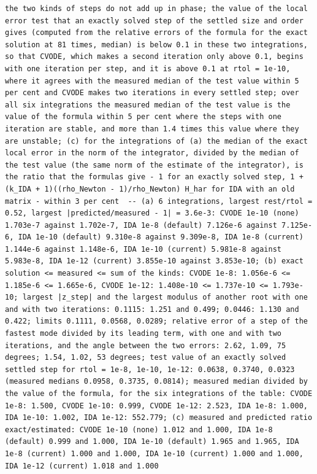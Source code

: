 \documentclass[
  10pt,
]{article}
\begin{document}
\begin{verbatim}
the two kinds of steps do not add up in phase; the value of the local error test that an exactly solved step of the settled size and order gives (computed from the relative errors of the formula for the exact solution at 81 times, median) is below 0.1 in these two integrations, so that CVODE, which makes a second iteration only above 0.1, begins with one iteration per step, and it is above 0.1 at rtol = 1e-10, where it agrees with the measured median of the test value within 5 per cent and CVODE makes two iterations in every settled step; over all six integrations the measured median of the test value is the value of the formula within 5 per cent where the steps with one iteration are stable, and more than 1.4 times this value where they are unstable; (c) for the integrations of (a) the median of the exact local error in the norm of the integrator, divided by the median of the test value (the same norm of the estimate of the integrator), is the ratio that the formulas give - 1 for an exactly solved step, 1 + (k_IDA + 1)((rho_Newton - 1)/rho_Newton) H_har for IDA with an old matrix - within 3 per cent  -- (a) 6 integrations, largest rest/rtol = 0.52, largest |predicted/measured - 1| = 3.6e-3: CVODE 1e-10 (none) 1.703e-7 against 1.702e-7, IDA 1e-8 (default) 7.126e-6 against 7.125e-6, IDA 1e-10 (default) 9.310e-8 against 9.309e-8, IDA 1e-8 (current) 1.144e-6 against 1.148e-6, IDA 1e-10 (current) 5.981e-8 against 5.983e-8, IDA 1e-12 (current) 3.855e-10 against 3.853e-10; (b) exact solution <= measured <= sum of the kinds: CVODE 1e-8: 1.056e-6 <= 1.185e-6 <= 1.665e-6, CVODE 1e-12: 1.408e-10 <= 1.737e-10 <= 1.793e-10; largest |z_step| and the largest modulus of another root with one and with two iterations: 0.1115: 1.251 and 0.499; 0.0446: 1.130 and 0.422; limits 0.1111, 0.0568, 0.0289; relative error of a step of the fastest mode divided by its leading term, with one and with two iterations, and the angle between the two errors: 2.62, 1.09, 75 degrees; 1.54, 1.02, 53 degrees; test value of an exactly solved settled step for rtol = 1e-8, 1e-10, 1e-12: 0.0638, 0.3740, 0.0323 (measured medians 0.0958, 0.3735, 0.0814); measured median divided by the value of the formula, for the six integrations of the table: CVODE 1e-8: 1.500, CVODE 1e-10: 0.999, CVODE 1e-12: 2.523, IDA 1e-8: 1.000, IDA 1e-10: 1.002, IDA 1e-12: 552.779; (c) measured and predicted ratio
exact/estimated: CVODE 1e-10 (none) 1.012 and 1.000, IDA 1e-8 (default) 0.999 and 1.000, IDA 1e-10 (default) 1.965 and 1.965, IDA 1e-8 (current) 1.000 and 1.000, IDA 1e-10 (current) 1.000 and 1.000, IDA 1e-12 (current) 1.018 and 1.000

\end{verbatim}
\end{document}
